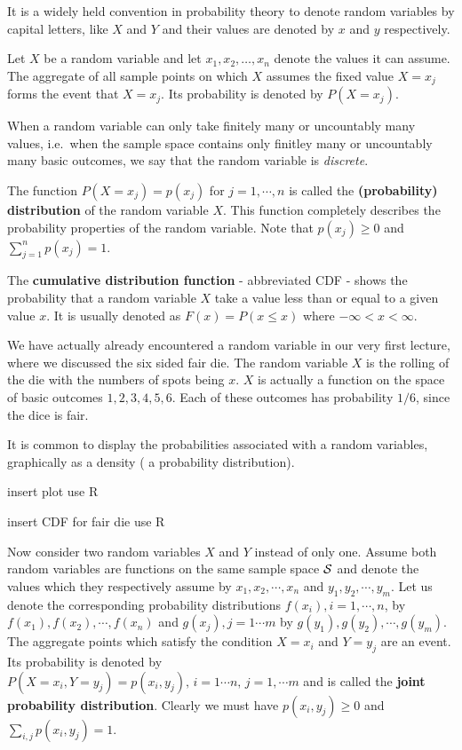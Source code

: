 \documentclass[
]{book}
\begin{document}
It is a widely held convention in probability theory to denote random variables by capital letters, like \(X\) and \(Y\) and their values are denoted by \(x\) and \(y\) respectively.

Let \(X\) be a random variable and let \(x_1, x_2, \dots , x_n\) denote the values it can assume. The
aggregate of all sample points on which \(X\) assumes the fixed value \(X = x_j\) forms the event
that \(X = x_j\). Its probability is denoted by \(P(X = x_j)\).

When a random variable can only take finitely many or uncountably many values, i.e.~when the
sample space contains only finitley many or uncountably many basic outcomes, we say that the
random variable is \emph{discrete}.

The function \(P(X = x_j) = p(x_j)\) for \(j = 1, \cdots ,n\) is called
the \textbf{(probability) distribution} of the random variable \(X\). This function completely
describes the probability properties of the random variable. Note that \(p(x_j) \geq 0\)
and \(\sum_{j=1}^n p(x_j) = 1\).

The \textbf{cumulative distribution function} - abbreviated CDF - shows the probability that a
random variable \(X\) take a value less than or equal to a given value \(x\). It is usually denoted as \(F(x) = P(x \leq x)\) where \(-\infty < x < \infty\).

We have actually already encountered a random variable in our very first lecture, where we discussed
the six sided fair die. The random variable \(X\) is the rolling of the die with the numbers of
spots being \(x\). \(X\) is actually a function on the space of basic outcomes \(1, 2, 3, 4, 5, 6\).
Each of these outcomes has probability \(1/6\), since the dice is fair.

It is common to display the probabilities associated with a random variables, graphically as
a density ( a probability distribution).

insert plot use R

insert CDF for fair die use R

Now consider two random variables \(X\) and \(Y\) instead of only one. Assume both random variables
are functions on the same sample space \({\cal S}\) and denote the values which they respectively
assume by \(x_1,x_2, \cdots, x_n\) and \(y_1, y_2, \cdots, y_m\). Let us denote the corresponding
probability distributions \(f(x_i), i = 1, \cdots, n\), by \(f(x_1), f(x_2), \cdots, f(x_n)\) and
\(g(x_j), j = 1 \cdots m\) by \(g(y_1), g(y_2), \cdots, g(y_m)\).
The aggregate points which satisfy the condition \(X = x_i\) and \(Y=y_j\) are an event. Its
probability is denoted by \(P(X=x_i, Y=y_j) = p(x_i, y_j), \, i = 1 \cdots n, \, j = 1,\cdots m\)
and is called the \textbf{joint probability distribution}. Clearly we must have
\(p(x_i,y_j) \geq 0\) and \(\sum_{i,j} p(x_i,y_j) = 1\).
\end{document}
